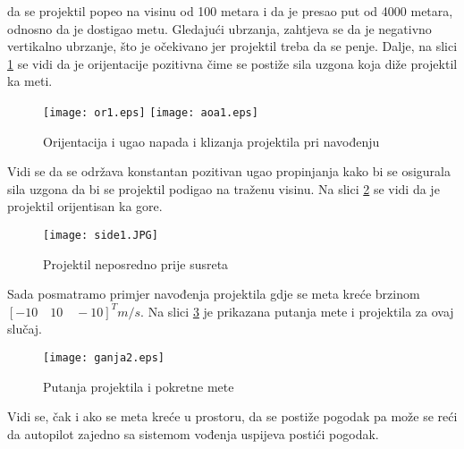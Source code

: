 da se projektil popeo na visinu od 100 metara i da je presao put od 4000 metara, odnosno da je 
dostigao metu. Gledajući ubrzanja, zahtjeva se da je negativno vertikalno ubrzanje, što je 
očekivano jer projektil treba da se penje. Dalje, na slici \ref{fig:or1} se vidi da 
je orijentacije pozitivna čime se postiže sila uzgona koja diže projektil ka meti. 
\begin{figure}[!ht]
    \centering
    \texttt{[image: or1.eps]}
    \texttt{[image: aoa1.eps]}
    \caption{Orijentacija i ugao napada i klizanja projektila pri navođenju}
    \label{fig:or1}
\end{figure}
Vidi se da se održava konstantan pozitivan ugao propinjanja kako bi se osigurala 
sila uzgona da bi se projektil podigao na traženu visinu. Na slici \ref{fig:side1} se 
vidi da je projektil orijentisan ka gore. 
\begin{figure}[!ht]
    \centering
    \texttt{[image: side1.JPG]}
    \caption{Projektil neposredno prije susreta}
    \label{fig:side1}
\end{figure}
Sada posmatramo primjer navođenja projektila gdje se meta kreće brzinom $[-10\quad 10\quad -10]^T m/s$.
Na slici \ref{fig:ganja2} je prikazana putanja mete i projektila za ovaj slučaj. 
\begin{figure}[!t]
    \centering
    \texttt{[image: ganja2.eps]}
    \caption{Putanja projektila i pokretne mete}
    \label{fig:ganja2}
\end{figure}
Vidi se, čak i ako se meta kreće u prostoru, da se postiže pogodak pa može se reći da autopilot zajedno sa sistemom vođenja uspijeva 
postići pogodak. 

